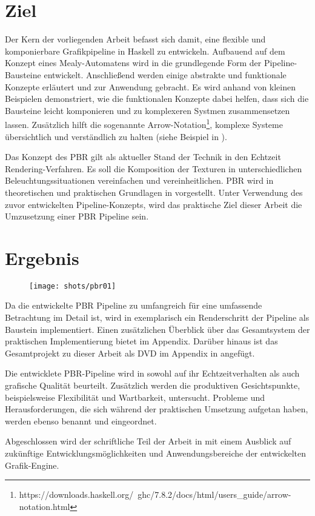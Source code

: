 \section{Ziel}

Der Kern der vorliegenden Arbeit befasst sich damit, eine flexible und komponierbare Grafikpipeline in Haskell zu entwickeln. Aufbauend auf dem Konzept eines Mealy-Automatens wird in  die grundlegende Form der Pipeline-Bausteine entwickelt. Anschließend werden einige abstrakte und funktionale Konzepte erläutert und zur Anwendung gebracht. Es wird anhand von kleinen Beispielen demonstriert, wie die funktionalen Konzepte dabei helfen, dass sich die Bausteine leicht komponieren und zu komplexeren Systmen zusammensetzen lassen. Zusätzlich hilft die sogenannte Arrow-Notation\footnote{https://downloads.haskell.org/~ghc/7.8.2/docs/html/users\_guide/arrow-notation.html}, komplexe Systeme übersichtlich und verständlich zu halten (siehe Beispiel in ).

Das Konzept des \acl{PBR} gilt als aktueller Stand der Technik in den Echtzeit Rendering-Verfahren. Es soll die Komposition der Texturen in unterschiedlichen Beleuchtungssituationen vereinfachen und vereinheitlichen. \ac{PBR} wird in theoretischen und praktischen Grundlagen in  vorgestellt. Unter Verwendung des zuvor entwickelten Pipeline-Konzepts, wird das praktische Ziel dieser Arbeit die Umzusetzung einer \ac{PBR} Pipeline sein.

\section{Ergebnis}
\begin{figure}
\centering
	\texttt{[image: shots/pbr01]}
\end{figure}

Da die entwickelte \ac{PBR} Pipeline zu umfangreich für eine umfassende Betrachtung im Detail ist, wird in  exemplarisch ein Renderschritt der Pipeline als Baustein implementiert. Einen zusätzlichen Überblick über das Gesamtsystem der praktischen Implementierung bietet  im Appendix. Darüber hinaus ist das Gesamtprojekt zu dieser Arbeit als DVD im Appendix in  angefügt.

Die entwicklete \ac{PBR}-Pipeline wird in  sowohl auf ihr Echtzeitverhalten als auch grafische Qualität beurteilt. Zusätzlich werden die produktiven Gesichtspunkte, beispielsweise Flexibilität und Wartbarkeit, untersucht. Probleme und Herausforderungen, die sich während der praktischen Umsetzung aufgetan haben, werden ebenso benannt und eingeordnet.

Abgeschlossen wird der schriftliche Teil der Arbeit in  mit einem Ausblick auf zukünftige Entwicklungsmöglichkeiten und Anwendungsbereiche der entwickelten Grafik-Engine.

